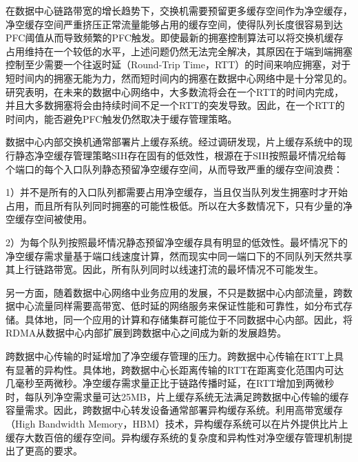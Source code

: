 在数据中心链路带宽的增长趋势下，交换机需要预留更多缓存空间作为净空缓存，净空缓存空间严重挤压正常流量能够占用的缓存空间，使得队列长度很容易到达PFC阈值从而导致频繁的PFC触发。即使最新的拥塞控制算法\cite{SIGCOMM15DCQCN,SIGCOMM15TIMELY,SIGCOMM16RDMA,SIGCOMM19HPCC}可以将交换机缓存占用维持在一个较低的水平，上述问题仍然无法完全解决，其原因在于端到端拥塞控制至少需要一个往返时延（Round-Trip Time，RTT）的时间来响应拥塞，对于短时间内的拥塞无能为力，然而短时间内的拥塞在数据中心网络中是十分常见的。研究表明，在未来的数据中心网络中，大多数流将会在一个RTT的时间内完成\cite{SIGCOMM18Homa,SIGCOMM20Aeolus}，并且大多数拥塞将会由持续时间不足一个RTT的突发导致\cite{IMC17microburst}。因此，在一个RTT的时间内，能否避免PFC触发仍然取决于缓存管理策略。

数据中心内部交换机通常部署片上缓存系统。经过调研发现，片上缓存系统中的现行静态净空缓存管理策略SIH存在固有的低效性，根源在于SIH按照最坏情况给每个端口的每个入口队列静态预留净空缓存空间，从而导致严重的缓存空间浪费：

1）并不是所有的入口队列都需要占用净空缓存，当且仅当队列发生拥塞时才开始占用，而且所有队列同时拥塞的可能性极低。所以在大多数情况下，只有少量的净空缓存空间被使用。

2）为每个队列按照最坏情况静态预留净空缓存具有明显的低效性。最坏情况下的净空缓存需求量基于端口线速度计算，然而现实中同一端口下的不同队列天然共享其上行链路带宽。因此，所有队列同时以线速打流的最坏情况不可能发生。

另一方面，随着数据中心网络中业务应用的发展，不只是数据中心内部流量，跨数据中心流量同样需要高带宽、低时延的网络服务来保证性能和可靠性\cite{bai2023empowering}，如分布式存储\cite{gao2021cloud,calder2011windows}。具体地，同一个应用的计算和存储集群可能位于不同数据中心内部。因此，将RDMA从数据中心内部扩展到跨数据中心之间成为新的发展趋势\cite{zhao2023deterministic}。

跨数据中心传输的时延增加了净空缓存管理的压力。跨数据中心传输在RTT上具有显著的异构性。具体地，跨数据中心长距离传输的RTT在距离变化范围内可达几毫秒至两微秒\cite{bai2023empowering}。净空缓存需求量正比于链路传播时延，在RTT增加到两微秒时，每队列净空需求量可达25MB，片上缓存系统无法满足跨数据中心传输的缓存容量需求。因此，跨数据中心转发设备通常部署异构缓存系统。利用高带宽缓存（High Bandwidth Memory，HBM）技术，异构缓存系统可以在片外提供比片上缓存大数百倍的缓存空间\cite{jedecHBM2E,kim2019design}。异构缓存系统的复杂度和异构性对净空缓存管理机制提出了更高的要求。


